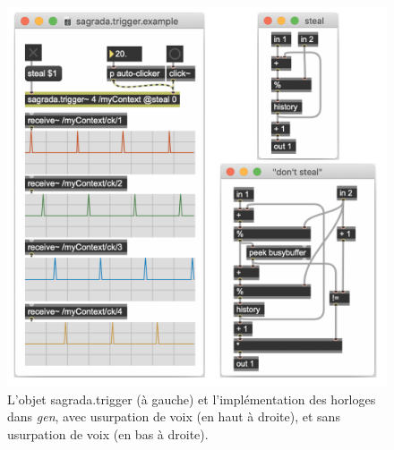 \begin{figure}[!htbp]
	\captionsetup{format=plain}
	\includegraphics[width=\textwidth]{gfx/04_algorithms/Sagrada-TriggerClock.png}
	\caption[Sagrada : horloge synchrone et assignation]{L'objet sagrada.trigger (à gauche) et l'implémentation des horloges dans \textit{gen}, avec usurpation de voix (en haut à droite), et sans usurpation de voix (en bas à droite).}
	\label{fig:algorithms:Sagrada-TriggerClock}
\end{figure}

